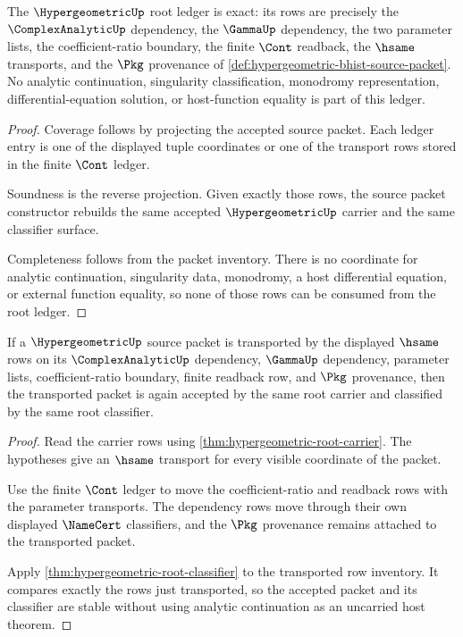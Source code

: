\begin{theorem}
\label{thm:hypergeometric-root-ledger}
The $\HypergeometricUp$ root ledger is exact: its rows are precisely the
$\ComplexAnalyticUp$ dependency, the $\GammaUp$ dependency, the two parameter
lists, the coefficient-ratio boundary, the finite $\Cont$ readback, the
$\hsame$ transports, and the $\Pkg$ provenance of
\autoref{def:hypergeometric-bhist-source-packet}. No analytic continuation,
singularity classification, monodromy representation, differential-equation
solution, or host-function equality is part of this ledger.
\end{theorem}
\begin{proof}
Coverage follows by projecting the accepted source packet. Each ledger entry is
one of the displayed tuple coordinates or one of the transport rows stored in
the finite $\Cont$ ledger.

Soundness is the reverse projection. Given exactly those rows, the source packet
constructor rebuilds the same accepted $\HypergeometricUp$ carrier and the same
classifier surface.

Completeness follows from the packet inventory. There is no coordinate for
analytic continuation, singularity data, monodromy, a host differential
equation, or external function equality, so none of those rows can be consumed
from the root ledger.
\end{proof}

\begin{theorem}
\label{thm:hypergeometric-root-stability}
If a $\HypergeometricUp$ source packet is transported by the displayed
$\hsame$ rows on its $\ComplexAnalyticUp$ dependency, $\GammaUp$ dependency,
parameter lists, coefficient-ratio boundary, finite readback row, and
$\Pkg$ provenance, then the transported packet is again accepted by the same
root carrier and classified by the same root classifier.
\end{theorem}
\begin{proof}
Read the carrier rows using
\autoref{thm:hypergeometric-root-carrier}. The hypotheses give an $\hsame$
transport for every visible coordinate of the packet.

Use the finite $\Cont$ ledger to move the coefficient-ratio and readback rows
with the parameter transports. The dependency rows move through their own
displayed $\NameCert$ classifiers, and the $\Pkg$ provenance remains attached
to the transported packet.

Apply \autoref{thm:hypergeometric-root-classifier} to the transported row
inventory. It compares exactly the rows just transported, so the accepted packet
and its classifier are stable without using analytic continuation as an
uncarried host theorem.
\end{proof}

